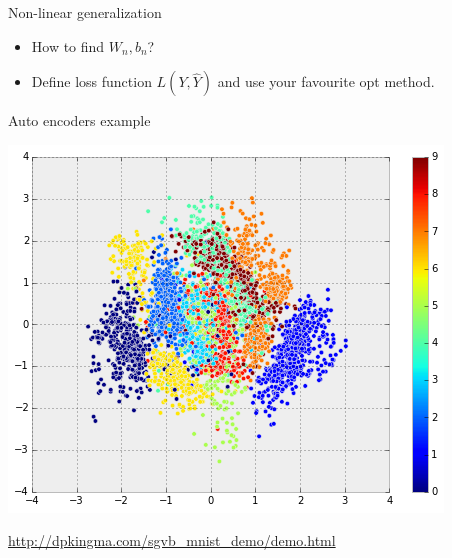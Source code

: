 \documentclass{beamer}
\begin{document}
\begin{frame}{Non-linear generalization}
	\begin{itemize}
		\pause \item How to find $W_n, b_n$? 
		\pause \item Define loss function $L(Y, \hat{Y})$ and  use your favourite opt method.
	\end{itemize}
\end{frame}

\begin{frame}{Auto encoders example}
		 \begin{center}
		 	\pause \includegraphics[scale=0.4]{img/autoenc}
		 \end{center}
	
	\pause \href{http://dpkingma.com/sgvb_mnist_demo/demo.html}{http://dpkingma.com/sgvb\_mnist\_demo/demo.html}
\end{frame}
\end{document}
